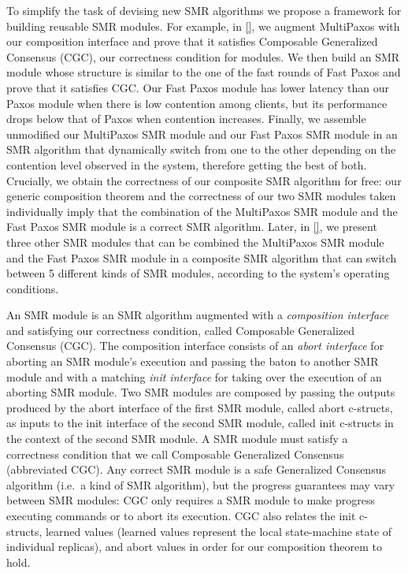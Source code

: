 To simplify the task of devising new SMR algorithms we propose a framework
for building reusable SMR modules. For example, in \cref{}, we augment
MultiPaxos with our composition interface and prove that it satisfies Composable
Generalized Consensus (CGC), our correctness condition for modules. We then
build an SMR module whose structure is similar to the one of the fast rounds of
Fast Paxos and prove that it satisfies CGC\@. Our Fast Paxos module has lower
latency than our Paxos module when there is low contention among clients, but
its performance drops below that of Paxos when contention increases. Finally,
we assemble unmodified our MultiPaxos SMR module and our Fast Paxos SMR module
in an SMR algorithm that dynamically switch from one to the other depending on
the contention level observed in the system, therefore getting the best of both.
Crucially, we obtain the correctness of our composite SMR algorithm for free:
our generic composition theorem and the correctness of our two SMR modules taken
individually imply that the combination of the MultiPaxos SMR module and the
Fast Paxos SMR module is a correct SMR algorithm. Later, in \cref{}, we present
three other SMR modules that can be combined the MultiPaxos SMR module and the
Fast Paxos SMR module in a composite SMR algorithm that can switch between 5
different kinds of SMR modules, according to the system's operating conditions.

An SMR module is an SMR algorithm augmented with a \emph{composition interface}
and satisfying our correctness condition, called Composable Generalized
Consensus (CGC). The composition interface consists of an \emph{abort interface}
for aborting an SMR module's execution and passing the baton to another
SMR module and with a matching \emph{init interface} for taking over the
execution of an aborting SMR module. Two SMR modules are composed by passing
the outputs produced by the abort interface of the first SMR module, called
abort c-structs, as inputs to the init interface of the second SMR module,
called init c-structs in the context of the second SMR module. A SMR module
must satisfy a correctness condition that we call Composable Generalized
Consensus (abbreviated CGC). Any correct SMR module is a safe Generalized
Consensus~\cite{Lamport05GeneralizeConsensus} algorithm (i.e.\ a kind of SMR
algorithm), but the progress guarantees may vary between SMR modules: CGC only
requires a SMR module to make progress executing commands or to abort its
execution. CGC also relates the init c-structs, learned values (learned values
represent the local state-machine state of individual replicas), and abort
values in order for our composition theorem to hold.


